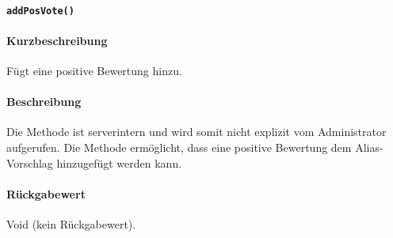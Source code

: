 \paragraph{\texttt{addPosVote()}}%
\paragraph*{Kurzbeschreibung}
Fügt eine positive Bewertung hinzu.
\paragraph*{Beschreibung}
Die Methode ist serverintern und wird somit nicht explizit vom Administrator aufgerufen.
Die Methode ermöglicht, dass eine positive Bewertung dem Alias-Vorschlag hinzugefügt werden kann.
\paragraph*{Rückgabewert}
Void (kein Rückgabewert).

